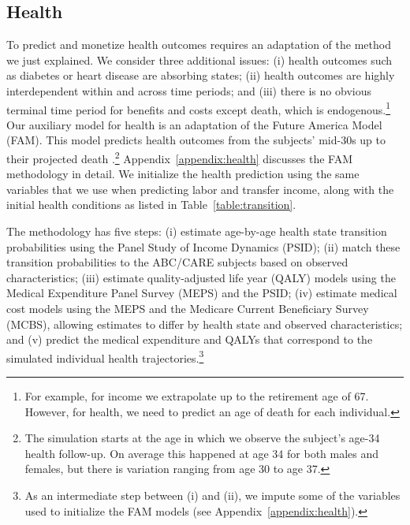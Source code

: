 \subsection{Health} \label{section:health}

To predict and monetize health outcomes requires an adaptation of the method we just explained. We consider three additional issues: (i) health outcomes such as diabetes or heart disease are absorbing states; (ii) health outcomes are highly interdependent within and across time periods; and (iii) there is no obvious terminal time period for benefits and costs except death, which is endogenous.\footnote{For example, for income we extrapolate up to the retirement age of 67. However, for health, we need to predict an age of death for each individual.} Our auxiliary model for health is an adaptation of the Future America Model (FAM). This model predicts health outcomes from the subjects' mid-30s up to their projected death \citep{Goldman_etal_2015_Future-Elderly-Model-Report}.\footnote{The simulation starts at the age in which we observe the subject's age-34 health follow-up. On average this happened at age 34 for both males and females, but there is variation ranging from age 30 to age 37.} Appendix~\ref{appendix:health} discusses the FAM methodology in detail. We initialize the health prediction using the same variables that we use when predicting labor and transfer income, along with the initial health conditions as listed in Table~\ref{table:transition}.

The methodology has five steps: (i) estimate age-by-age health state transition probabilities using the Panel Study of Income Dynamics (PSID); (ii) match these transition probabilities to the ABC/CARE subjects based on observed characteristics; (iii) estimate quality-adjusted life year (QALY) models using the Medical Expenditure Panel Survey (MEPS) and the PSID; (iv) estimate medical cost models using the MEPS and the Medicare Current Beneficiary Survey (MCBS), allowing estimates to differ by health state and observed characteristics; and (v) predict the medical expenditure and QALYs that correspond to the simulated individual health trajectories.\footnote{As an intermediate step between (i) and (ii), we impute some of the variables used to initialize the FAM models (see Appendix~\ref{appendix:health}).}

